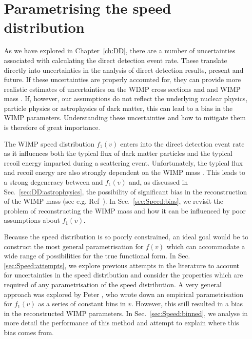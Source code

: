 \chapter{Parametrising the speed distribution}
\label{ch:Speed}

As we have explored in Chapter~\ref{ch:DD}, there are a number of uncertainties associated with calculating the direct detection event rate. These translate directly into uncertainties in the analysis of direct detection results, present and future. If these uncertainties are properly accounted for, they can provide more realistic estimates of uncertainties on the WIMP cross sections \sigmapsi and \sigmapsd and WIMP mass \mchi. If, however, our assumptions do not reflect the underlying nuclear physics, particle physics or astrophysics of dark matter, this can lead to a bias in the WIMP parameters. Understanding these uncertainties and how to mitigate them is therefore of great importance.

The WIMP speed distribution $f_1(v)$ enters into the direct detection event rate as it influences both the typical flux of dark matter particles and the typical recoil energy imparted during a scattering event. Unfortunately, the typical flux and recoil energy are also strongly dependent on the WIMP mass \mchi. This leads to a strong degeneracy between \mchi and $f_1(v)$ and, as discussed in Sec.~\ref{sec:DD:astrophysics}, the possibility of significant bias in the reconstruction of the WIMP mass (see e.g. Ref~\cite{Peter:2011}). In Sec.~\ref{sec:Speed:bias}, we revisit the problem of reconstructing the WIMP mass and how it can be influenced by poor assumptions about $f_1(v)$. 

Because the speed distribution is so poorly constrained, an ideal goal would be to construct the most general parametrisation for $f(v)$ which can accommodate a wide range of possibilities for the true functional form. In Sec.~ \ref{sec:Speed:attempts}, we explore previous attempts in the literature to account for uncertainties in the speed distribution and consider the properties which are required of any parametrisation of the speed distribution. A very general approach was explored by Peter \cite{Peter:2011}, who wrote down an empirical parametrisation for $f_1(v)$ as a series of constant bins in $v$. However, this still resulted in a bias in the reconstructed WIMP parameters. In Sec.~\ref{sec:Speed:binned}, we analyse in more detail the performance of this method and attempt to explain where this bias comes from.

